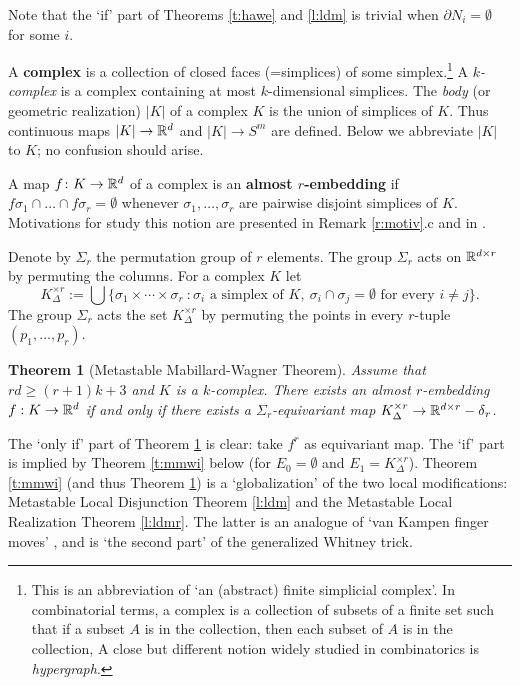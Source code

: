 \documentclass[12pt]{article}
\def\diag{\delta}
\theoremstyle{plain}
\newtheorem{Theorem}{Theorem}[section]
\theoremstyle{definition}
\begin{document}
Note that the `if' part of Theorems \ref{t:hawe} and \ref{l:ldm}
is trivial when $\partial N_i=\emptyset$ for some $i$.

A {\bf complex} is a collection of closed faces (=simplices) of some simplex.\footnote{This is an abbreviation of `an (abstract) finite simplicial complex'.
In combinatorial terms, a complex is a collection of subsets of a finite set such that
if a subset $A$ is in the collection, then each subset of $A$ is in the collection,
A close but different notion widely studied in combinatorics is {\it hypergraph}.}
A {\it $k$-complex} is a complex containing at most $k$-dimensional simplices.
The {\it body} (or geometric realization) $|K|$ of a complex $K$ is the union of simplices of $K$.
Thus continuous
maps $|K|\to{\mathbb R}^d$ and
$|K|\to S^m$ are defined.
Below we abbreviate $|K|$ to $K$; no confusion should arise.

A map $f\colon K\to{\mathbb R}^d$ of a complex is an {\bf almost $r$-embedding} if
$f\sigma_1\cap\ldots\cap f\sigma_r=\emptyset$
whenever $\sigma_1,\ldots,\sigma_r$ are pairwise disjoint simplices of $K$.
Motivations for study this notion are presented in Remark \ref{r:motiv}.c and in \cite[\S1]{Sk16}.

Denote by $\Sigma_r$ the permutation group of $r$ elements.
The group $\Sigma_r$ acts on ${\mathbb R}^{d\times r}$ by permuting the columns.
For a complex $K$ let
$$K^{\times r}_{\Delta}:= \bigcup \{ \sigma_1 \times \cdots \times \sigma_r
\ : \sigma_i \textrm{ a simplex of }K,\ \sigma_i \cap \sigma_j = \emptyset \mbox{ for every $i \neq j$} \}.$$
The group $\Sigma_r$ acts the set $K^{\times r}_{\Delta}$ by permuting the points in every $r$-tuple
$(p_1,\ldots, p_r)$.

\begin{Theorem}[Metastable Mabillard-Wagner Theorem]\label{t:mmw}
Assume that $rd\ge(r+1)k+3$ and $K$ is a $k$-complex.
There exists an almost $r$-embedding $f:K\to{\mathbb R}^d$ if and only if there exists a $\Sigma_r$-equivariant map
$K^{\times r}_{\Delta}\to \R^{d\times r}-\diag\phantom{}_r$.
\end{Theorem}


The `only if' part of Theorem \ref{t:mmw} is clear: take $f^r$ as equivariant map.
The `if' part is implied by Theorem \ref{t:mmwi} below (for $E_0=\emptyset$
and $E_1=K^{\times r}_{\Delta}$).
Theorem \ref{t:mmwi} (and thus Theorem \ref{t:mmw}) is a `globalization' of the two local modifications:  Metastable Local Disjunction Theorem \ref{l:ldm} and the Metastable Local Realization Theorem \ref{l:ldmr}.
The latter is an analogue of `van Kampen finger moves' \cite[figures 4.2.V and 8.3, \S8]{Sk06},
and is `the second part' of the generalized Whitney trick.
\end{document}
